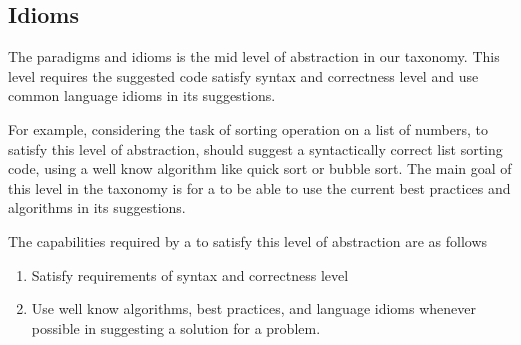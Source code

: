 \subsection{Idioms}
The paradigms and idioms is the mid level of abstraction in our taxonomy. This level requires the suggested code satisfy syntax and correctness level and use common language idioms in its suggestions. 

For example, considering the task of sorting operation on a list of numbers, to satisfy this level of abstraction, \cct{} should suggest a syntactically correct list sorting code, using a well know algorithm like quick sort or bubble sort. The main goal of this level in the taxonomy is for a \cct{} to be able to use the current best practices and algorithms in its suggestions.

The capabilities required by a \cct{} to satisfy this level of abstraction are as follows
\begin{enumerate}
    \item Satisfy requirements of syntax and correctness level
    \item Use well know algorithms, best practices, and language idioms whenever possible in suggesting a solution for a problem.
\end{enumerate}
